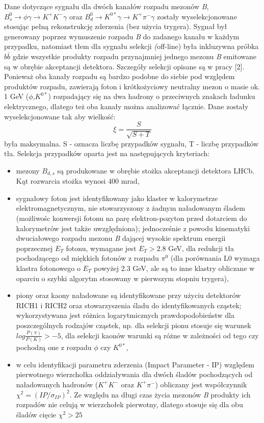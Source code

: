 \documentclass{pracamgr}
\begin{document}
Dane dotyczące sygnału dla dwóch kanałów rozpadu mezonów \textit{B}, $B^{0}_{s}\rightarrow \phi\gamma\rightarrow K^+K^-\gamma$ oraz $B^{0}_{d}\rightarrow K^{0*}\gamma\rightarrow K^+\pi^-\gamma$ zostały wyselekcjonowane stosując pełną rekonstrukcję zderzenia (bez użycia trygera). Sygnał był generowany poprzez wymuszenie rozpadu \textit{B} do zadanego kanału w każdym przypadku, natomiast tłem dla sygnału selekcji \textit(off-line) była inkluzywna próbka $b\bar{b}$ gdzie wszystkie produkty rozpadu przynajmniej jednego mezonu \textit{B} emitowane są w obrębie akceptancji detektora. Szczegóły selekcji opisane są w pracy [2]. Ponieważ oba kanały rozpadu są bardzo podobne do siebie pod względem produktów rozpadu, zawierają foton i krótkożyciowy neutralny mezon o masie ok. 1 GeV ($\phi$,$K^{0*}$) rozpadający się na dwa hadrony o przeciwnych znakach ładunku elektrycznego, dlatego też oba kanały można analizować łącznie. Dane zostały wyselekcjonowane tak aby wielkość:
\[
 \xi = \frac{S}{\sqrt{S+T}}
\]
była maksymalna. S - oznacza liczbę przypadków sygnału, T - liczbę przypadków tła. Selekcja przypadków oparta jest na następujących kryteriach:
\begin{itemize}
 \item mezony $B_{d,s}$ są produkowane w obrębie stożka akceptancji detektora LHCb. Kąt rozwarcia stożka wynosi 400 mrad,
 \item sygnałowy foton jest identyfikowany jako klaster w kalorymetrze elektromagnetycznym, nie stowarzyszony z żadnym naładowanym śladem (możliwośc konwersji fotonu na parę elektron-pozyton przed dotarciem do kalorymetrów jest także uwzględniona); jednocześnie z powodu kinematyki dwuciałowego rozpadu mezonu \textit{B} dającej wysokie spektrum energii poprzecznej $E_T$ fotonu, wymagane jest $E_T > 2.8$ GeV, dla redukcji tła pochodzącego od miękkich fotonów z rozpadu $\pi^0$ (dla porównania L0 wymaga klastra fotonowego o $E_T$ powyżej 2.3 GeV, ale są to inne klastry obliczane w oparciu o szybki algorytm stosowany w pierwszym stopniu trygera),
 \item piony oraz kaony naładowane są identyfikowane przy użyciu detektorów RICH1 i RICH2 oraz stowarzyszenia śladu do identyfikowanych cząstek; wykorzystywana jest różnica logarytmicznych prawdopodobieństw dla poszczególnych rodzajów cząstek, np. dla selekcji pionu stosuje się warunek $log\frac{P(\pi)}{P(K)} > -5$, dla selekcji kaonów warunki są różne w zależności od tego czy pochodzą one z rozpadu $\phi$ czy $K^{0*}$,
 \item  w celu identyfikacji parametru zderzenia (Impact Parameter - IP) względem pierwotnego wierzchołka oddziaływania dla dwóch śladów pochodzących od naładowanych hadronów ($K^{+}K^{-}$ oraz $K^{+}\pi^{-}$) obliczany jest współczynnik $\chi^{2} = \left(IP/\sigma_{IP}\right)^{2}$. Ze względu na długi czas życia mezonów \textit{B} produkty ich rozpadów nie celują w wierzchołek pierwotny, dlatego stosuje się dla obu śladów cięcie $\chi^{2}>25$
\end{itemize}
\end{document}
